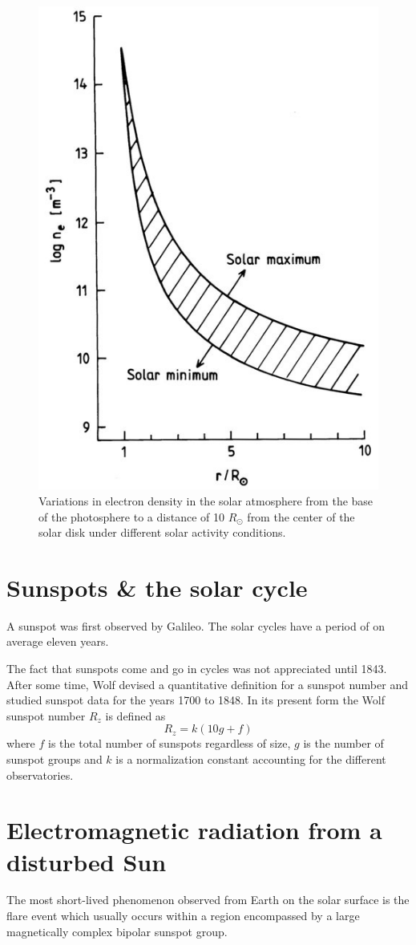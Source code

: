 \begin{figure}[t]
    \centering
    \includegraphics[width=.4\linewidth]{bilder/L9_variations_in_electron_density.jpg}
    \caption{Variations in electron density in the solar atmosphere from the base of the photosphere to a distance of 10 \(R_\odot \) from the center of the solar disk under different solar activity conditions.}\label{fig:L9_variations_in_electron_density}
\end{figure}

\section{Sunspots \& the solar cycle}
A sunspot was first observed by Galileo. The solar cycles have a period of on average eleven years.

The fact that sunspots come and go in cycles was not appreciated until 1843. After some time, Wolf devised a quantitative definition for a sunspot number and studied sunspot data for the years 1700 to 1848. In its present form the Wolf sunspot number \(R_z\) is defined as
\begin{equation}\label{eq:L9_wolf_sunspot_number}
    R_z=k\left(10g+f\right)
\end{equation}
where \(f\) is the total number of sunspots regardless of size, \(g\) is the number of sunspot groups and \(k\) is a normalization constant accounting for the different observatories.

\section{Electromagnetic radiation from a disturbed Sun}
The most short-lived phenomenon observed from Earth on the solar surface is the flare event which usually occurs within a region encompassed by a large magnetically complex bipolar sunspot group.

